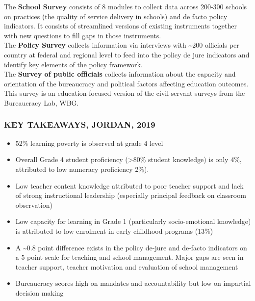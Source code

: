 \documentclass[twocolumn]{article}
\begin{document}
The \textbf{School Survey} consists of 8 modules to collect data across
200-300 schools on practices (the quality of service delivery in
schools) and de facto policy indicators. It consists of streamlined
versions of existing instruments together with new questions to fill
gaps in those instruments.\\
The \textbf{Policy Survey} collects information via interviews with
\textasciitilde{}200 officials per country at federal and regional level
to feed into the policy de jure indicators and identify key elements of
the policy framework.\\
The \textbf{Survey of public officials} collects information about the
capacity and orientation of the bureaucracy and political factors
affecting education outcomes. This survey is an education-focused
version of the civil-servant surveys from the Bureaucracy Lab, WBG.

\hypertarget{key-takeaways-jordan-2019}{%
\subsubsection{\texorpdfstring{\textbf{KEY TAKEAWAYS, JORDAN,
2019}}{KEY TAKEAWAYS, JORDAN, 2019}}\label{key-takeaways-jordan-2019}}

\begin{itemize}
\item
  52\% learning poverty is observed at grade 4 level
\item
  Overall Grade 4 student proficiency (\textgreater{}80\% student
  knowledge) is only 4\%, attributed to low numeracy proficiency 2\%).
  \vfill\null
\item
  Low teacher content knowledge attributed to poor teacher support and
  lack of strong instructional leadership (especially principal feedback
  on classroom observation)
\item
  Low capacity for learning in Grade 1 (particularly socio-emotional
  knowledge) is attributed to low enrolment in early childhood programs
  (13\%)
\item
  A \textasciitilde{}0.8 point difference exists in the policy de-jure
  and de-facto indicators on a 5 point scale for teaching and school
  management. Major gaps are seen in teacher support, teacher motivation
  and evaluation of school management
\item
  Bureaucracy scores high on mandates and accountability but low on
  impartial decision making
\end{itemize}
\end{document}
